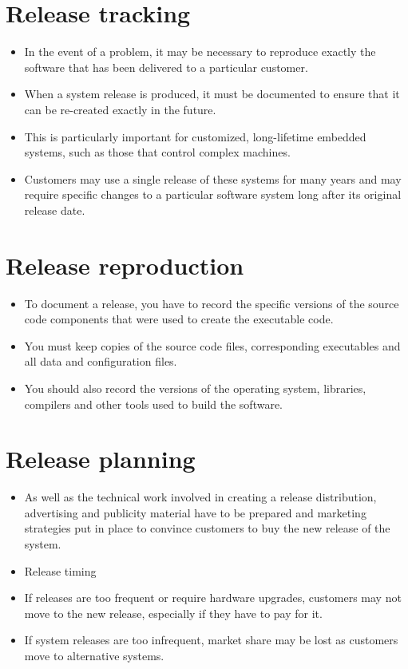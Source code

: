 \section{Release tracking}
\begin{itemize}

\item In the event of a problem, it may be necessary to reproduce exactly the software that has been delivered to a particular customer.

\item When a system release is produced, it must be documented to ensure that it can be re-created exactly in the future.

\item This is particularly important for customized, long-lifetime embedded systems, such as those that control complex machines.

   \item Customers may use a single release of these systems for many years and may require specific changes to a particular software system long after its original release date.
\end{itemize}
\section{Release reproduction}
\begin{itemize}
\item To document a release, you have to record the specific versions of the source code components that were used to create the executable code.

\item You must keep copies of the source code files, corresponding executables and all data and configuration files.

\item You should also record the versions of the operating system, libraries, compilers and other tools used to build the software.

\end{itemize}
\section{Release planning}
\begin{itemize}

\item As well as the technical work involved in creating a release distribution, advertising and publicity material have to be prepared and marketing strategies put in place to convince customers to buy the new release of the system.

\item Release timing

   \item If releases are too frequent or require hardware upgrades, customers may not move to the new release, especially if they have to pay for it.
   \item If system releases are too infrequent, market share may be lost as customers move to alternative systems.

\end{itemize}
